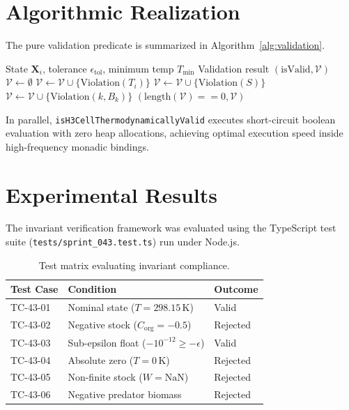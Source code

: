 \documentclass[10pt,twocolumn,letterpaper]{article}
\begin{document}
\section{Algorithmic Realization}
The pure validation predicate is summarized in Algorithm~\ref{alg:validation}.

\begin{algorithm}[h]
\caption{Thermodynamic Invariant Predicate}
\label{alg:validation}
\begin{algorithmic}[1]
\REQUIRE State $\mathbf{X}_i$, tolerance $\epsilon_{\text{tol}}$, minimum temp $T_{\min}$
\ENSURE Validation result $(\text{isValid}, \mathcal{V})$
\STATE $\mathcal{V} \leftarrow \emptyset$
    \STATE $\mathcal{V} \leftarrow \mathcal{V} \cup \{\text{Violation}(T_i)\}$
\ENDIF
{}
        \STATE $\mathcal{V} \leftarrow \mathcal{V} \cup \{\text{Violation}(S)\}$
    \ENDIF
\ENDFOR
{}
        \STATE $\mathcal{V} \leftarrow \mathcal{V} \cup \{\text{Violation}(k, B_k)\}$
    \ENDIF
\ENDFOR
\RETURN $(\text{length}(\mathcal{V}) == 0, \mathcal{V})$
\end{algorithmic}
\end{algorithm}

In parallel, \texttt{isH3CellThermodynamicallyValid} executes short-circuit boolean evaluation with zero heap allocations, achieving optimal execution speed inside high-frequency monadic bindings.

\section{Experimental Results}
The invariant verification framework was evaluated using the TypeScript test suite (\texttt{tests/sprint\_043.test.ts}) run under Node.js.

\begin{table}[h]
\centering
\small
\begin{tabular}{lll}
\toprule
\textbf{Test Case} & \textbf{Condition} & \textbf{Outcome} \\
\midrule
TC-43-01 & Nominal state ($T=298.15\,\text{K}$) & Valid \\
TC-43-02 & Negative stock ($C_{\text{org}} = -0.5$) & Rejected \\
TC-43-03 & Sub-epsilon float ($-10^{-12} \ge -\epsilon$) & Valid \\
TC-43-04 & Absolute zero ($T = 0\,\text{K}$) & Rejected \\
TC-43-05 & Non-finite stock ($W = \text{NaN}$) & Rejected \\
TC-43-06 & Negative predator biomass & Rejected \\
\bottomrule
\end{tabular}
\caption{Test matrix evaluating invariant compliance.}
\label{tab:results}
\end{table}
\end{document}
